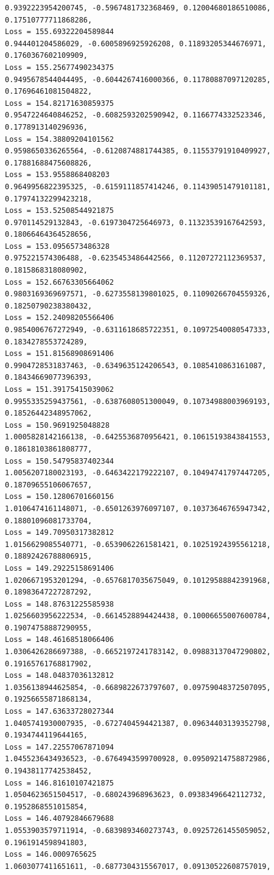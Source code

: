 \documentclass[11pt]{article}
\begin{document}
\begin{Verbatim}[commandchars=\\\{\}]
0.9392223954200745, -0.5967481732368469, 0.12004680186510086,
0.17510777711868286,
Loss = 155.69322204589844
0.944401204586029, -0.6005896925926208, 0.11893205344676971, 0.1760367602109909,
Loss = 155.25677490234375
0.9495678544044495, -0.6044267416000366, 0.11780887097120285,
0.17696461081504822,
Loss = 154.82171630859375
0.9547224640846252, -0.6082593202590942, 0.1166774332523346, 0.1778913140296936,
Loss = 154.38809204101562
0.9598650336265564, -0.6120874881744385, 0.11553791910409927,
0.17881688475608826,
Loss = 153.9558868408203
0.9649956822395325, -0.6159111857414246, 0.11439051479101181,
0.17974132299423218,
Loss = 153.52508544921875
0.970114529132843, -0.6197304725646973, 0.11323539167642593,
0.18066464364528656,
Loss = 153.0956573486328
0.975221574306488, -0.6235453486442566, 0.11207272112369537, 0.1815868318080902,
Loss = 152.66763305664062
0.9803169369697571, -0.6273558139801025, 0.11090266704559326,
0.18250790238380432,
Loss = 152.24098205566406
0.9854006767272949, -0.6311618685722351, 0.10972540080547333,
0.1834278553724289,
Loss = 151.81568908691406
0.9904728531837463, -0.6349635124206543, 0.1085410863161087,
0.18434669077396393,
Loss = 151.39175415039062
0.9955335259437561, -0.6387608051300049, 0.10734988003969193,
0.18526442348957062,
Loss = 150.9691925048828
1.0005828142166138, -0.6425536870956421, 0.10615193843841553,
0.18618103861808777,
Loss = 150.54795837402344
1.0056207180023193, -0.6463422179222107, 0.10494741797447205,
0.18709655106067657,
Loss = 150.12806701660156
1.0106474161148071, -0.6501263976097107, 0.10373646765947342,
0.18801096081733704,
Loss = 149.70950317382812
1.0156629085540771, -0.6539062261581421, 0.10251924395561218,
0.18892426788806915,
Loss = 149.29225158691406
1.0206671953201294, -0.6576817035675049, 0.10129588842391968,
0.18983647227287292,
Loss = 148.87631225585938
1.0256603956222534, -0.6614528894424438, 0.10006655007600784,
0.19074758887290955,
Loss = 148.46168518066406
1.0306426286697388, -0.6652197241783142, 0.09883137047290802,
0.19165761768817902,
Loss = 148.04837036132812
1.0356138944625854, -0.6689822673797607, 0.09759048372507095,
0.19256655871868134,
Loss = 147.63633728027344
1.0405741930007935, -0.6727404594421387, 0.09634403139352798,
0.1934744119644165,
Loss = 147.22557067871094
1.0455236434936523, -0.6764943599700928, 0.09509214758872986,
0.19438117742538452,
Loss = 146.81610107421875
1.0504623651504517, -0.680243968963623, 0.09383496642112732, 0.1952868551015854,
Loss = 146.40792846679688
1.0553903579711914, -0.6839893460273743, 0.09257261455059052,
0.1961914598941803,
Loss = 146.0009765625
1.0603077411651611, -0.6877304315567017, 0.09130522608757019,

\end{Verbatim}
\end{document}
